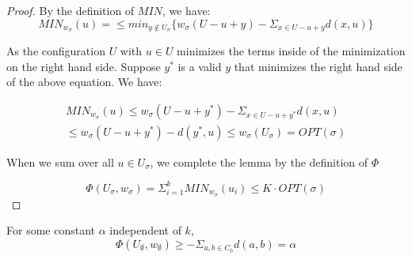 \begin{proof}
     By the definition of $MIN$, we have:
     \begin{equation*}
        MIN_{w_\sigma}(u) = \leq min_{y \not \in U_\sigma} \{ w_\sigma(U - u + y) - \Sigma_{x \in U - u + y} d(x, u)\}
     \end{equation*}

     As the configuration $U$ with $u \in U$ minimizes the terms inside of the minimization on the right hand side. Suppose $y^*$ is a valid $y$ that minimizes the right hand side of the above equation. We have:
     
     \begin{equation*}
        \begin{gathered}
            MIN_{w_\sigma}(u) \leq w_\sigma(U - u + y^*) - \Sigma_{x \in U - u + y^*} d(x, u) \\
        \leq w_\sigma(U - u + y^*) - d(y^*, u) \leq w_\sigma(U_\sigma) = OPT(\sigma)
        \end{gathered}
     \end{equation*}

     When we sum over all $u \in U_\sigma$, we complete the lemma by the definition of $\Phi$
     
     \begin{equation*}
        \Phi(U_\sigma, w_\sigma) = \Sigma_{i=1}^k MIN_{w_\sigma}(u_i) \leq K \cdot  OPT(\sigma)
     \end{equation*}
\end{proof}

\begin{lemma}
    \label{lem:er2}
    For some constant $\alpha$ independent of $k$,
    \begin{equation*}
        \Phi(U_\emptyset, w_\emptyset) \geq - \Sigma_{a, b \in C_0} d(a, b) = \alpha
    \end{equation*}
\end{lemma}


